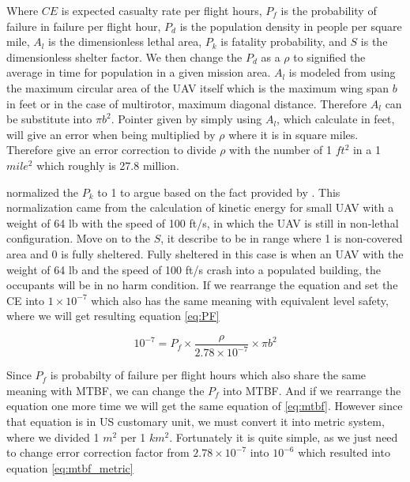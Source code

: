 \documentclass[12pt]{report}
\begin{document}
            Where \(CE\) is expected casualty rate per flight hours, \(P_f\) is the probability of failure in failure
            per flight hour, \(P_d\) is the population density in people per square mile, \(A_l\) is the dimensionless
            lethal area, \(P_k\) is fatality probability, and \(S\) is the dimensionless shelter factor. We then change
            the \(P_d\) as a \(\rho\) to signified the average in time for population in a given mission area. \(A_l\)
            is modeled from using the maximum circular area of the UAV itself which is the maximum wing span \(b\) in
            feet or in the case of multirotor, maximum diagonal distance. Therefore \(A_l\) can be substitute into \(\pi
            b^2\). Pointer given by \cite{burke_system-level_2011} simply using \(A_l\), which calculate in feet, will
            give an error when being multiplied by \(\rho\) where it is in square miles. Therefore
            \cite{burke_system-level_2011} give an error correction to divide \(\rho\) with the number of 1 \(ft^2\) in
            a 1 \(mile^2\) which roughly is 27.8 million. 

            \cite{burke_system-level_2011} normalized the \(P_k\) to 1 to argue based on the fact provided by
            \cite{arc_unmanned_2015}. This normalization came from the calculation of kinetic energy for small UAV with
            a weight of 64 lb with the speed of 100 ft/s, in which the UAV is still in non-lethal configuration. Move on
            to the \(S\), it describe to be in range where 1 is non-covered area and 0 is fully sheltered. Fully
            sheltered in this case is when an UAV with the weight of 64 lb and the speed of 100 ft/s crash into a
            populated building, the occupants will be in no harm condition. If we rearrange the equation and set the
            \ac{CE} into \(1 \times 10^{-7}\) which also has the same meaning with equivalent level safety, where we
            will get resulting equation \ref{eq:PF}

            \begin{equation}\label{eq:PF}
                10^{-7}= P_f \times \frac{\rho}{2.78 \times 10^{-7}} \times \pi b^2
            \end{equation}

            Since \(P_f\) is probabilty of failure per flight hours which also share the same meaning with \ac{MTBF}, we
            can change the \(P_f\) into MTBF. And if we rearrange the equation one more time we will get the same
            equation of \ref{eq:mtbf}. However since that equation is in US customary unit, we must convert it into
            metric system, where we divided 1 \(m^2\) per 1 \(km^2\). Fortunately it is quite simple, as we just need to
            change error correction factor from \(2.78 \times 10^{-7}\) into \(10^{-6}\) which resulted into equation
            \ref{eq:mtbf_metric}
\end{document}
